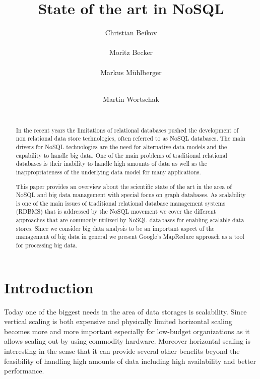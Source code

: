 \documentclass{sig-alternate}
\begin{document}
\title{State of the art in NoSQL}
\author{
\alignauthor Christian Beikov\\
       \\
\alignauthor Moritz Becker\\
       \\
\alignauthor Markus M\"uhlberger\\
       \\
\and
\alignauthor Martin Wortschak\\
       \\
}

\maketitle
\begin{abstract}

In the recent years the limitations of relational databases pushed the development of non relational data store technologies, often referred to as NoSQL databases. The main drivers for NoSQL technologies are the need for alternative data models and the capability to handle big data. One of the main problems of traditional relational databases is their inability to handle high amounts of data as well as the inappropriateness of the underlying data model for many applications.


This paper provides an overview about the scientific state of the art in the area of NoSQL and big data management with special focus on graph databases. As scalability is one of the main issues of traditional relational database management systems (RDBMS) that is addressed by the NoSQL movement we cover the different approaches that are commonly utilized by NoSQL databases for enabling scalable data stores. Since we consider big data analysis to be an important aspect of the management of big data in general we present Google's MapReduce approach as a tool for processing big data.

\end{abstract}

\section{Introduction}

Today one of the biggest needs in the area of data storages is scalability. Since vertical scaling is both expensive and physically limited horizontal scaling becomes more and more important especially for low-budget organizations as it allows scaling out by using commodity hardware. Moreover horizontal scaling is interesting in the sense that it can provide several other benefits beyond the feasibility of handling high amounts of data including high availability and better performance. 
\end{document}
